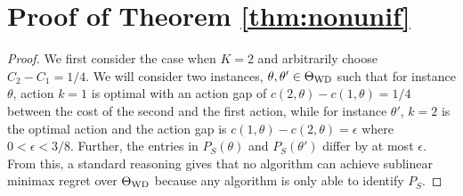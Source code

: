 \section*{Proof of Theorem \ref{thm:nonunif}}
\begin{proof}
We first consider the case when $K=2$ and arbitrarily choose $C_2 - C_1 = 1/4$. 
We will consider two instances, $\theta,\theta'\in \Theta_{\mathrm{WD}}$ such that for instance $\theta$, 
action $k=1$ is optimal with an action gap of $c(2,\theta) - c(1,\theta) = 1/4$ between the cost of the second and the first
action,  while for instance $\theta'$, $k=2$ is the optimal action and the action gap is $c(1,\theta) - c(2,\theta) = \epsilon$
where $0<\epsilon<3/8$.
Further, the entries in $P_S(\theta)$ and $P_S(\theta')$ differ by at most $\epsilon$. 
From this, a standard reasoning gives that no algorithm can achieve sublinear minimax regret over $\Theta_{\mathrm{WD}}$ because any
algorithm is only able to identify $P_S$. 


\end{proof}
